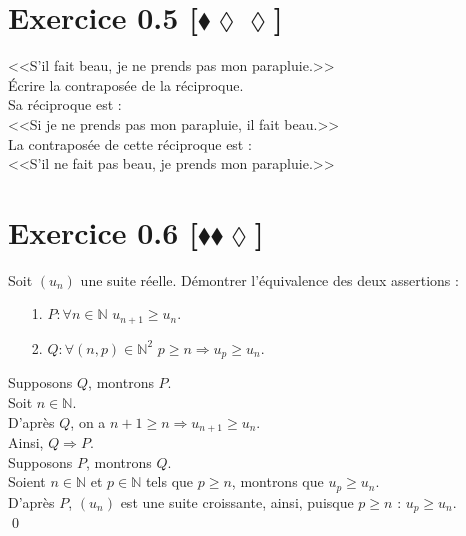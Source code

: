 \documentclass[10pt]{article}
\begin{document}
\section*{Exercice 0.5 [$\blacklozenge\lozenge\lozenge$]}
\begin{tcolorbox}[enhanced, width=7in, center, size=fbox, fontupper=\large, drop shadow southwest]
    <<S'il fait beau, je ne prends pas mon parapluie.>>\\
    Écrire la contraposée de la réciproque.\\[0.5cm]
    Sa réciproque est :\\
    <<Si je ne prends pas mon parapluie, il fait beau.>>\\[0.5cm]
    La contraposée de cette réciproque est :\\
    <<S'il ne fait pas beau, je prends mon parapluie.>>
\end{tcolorbox}

\section*{Exercice 0.6 [$\blacklozenge\blacklozenge\lozenge$]}
\begin{tcolorbox}[enhanced, width=7in, center, size=fbox, fontupper=\large, drop shadow southwest]
    Soit $(u_n)$ une suite réelle. Démontrer l'équivalence des deux assertions :
    \begin{itemize}
        \item[1.] $P:\forall{n\in\mathbb{N}}$ \hspace{0.25cm} $u_{n+1} \geq u_n$. 
        \item[2.] $Q:\forall{(n,p)\in\mathbb{N}^2}$ \hspace{0.25cm} $p \geq n \Longrightarrow u_p \geq u_n$. 
    \end{itemize}
    Supposons $Q$, montrons $P$.\\
    Soit $n\in\mathbb{N}$.\\
    D'après $Q$, on a $n+1\geq n \Longrightarrow u_{n+1} \geq u_n$.\\
    Ainsi, $Q\Longrightarrow P$.\\[0.5cm]
    Supposons $P$, montrons $Q$.\\
    Soient $n\in\mathbb{N}$ et $p\in\mathbb{N}$ tels que $p\geq n$, montrons que $u_p\geq u_n$.\\
    D'après $P$, $(u_n)$ est une suite croissante, ainsi, puisque $p\geq n$ : $u_p\geq u_n$.\\
    \qed
    \end{tcolorbox}
\end{document}
